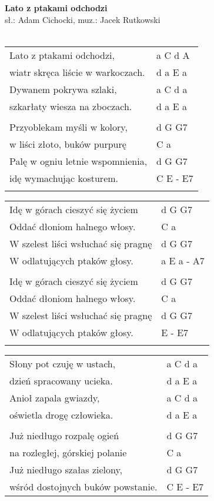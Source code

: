\documentclass[a5paper]{article}
\begin{document}


\noindent
\fontsize{12pt}{15pt}\selectfont
\textbf{Lato z ptakami odchodzi} \\
\fontsize{8pt}{10pt}\selectfont
sł.: Adam Cichocki, muz.: Jacek Rutkowski \\ \\
\fontsize{10pt}{12pt}\selectfont
{}
\begin{tabular}{@{}p{8cm}p{3cm}@{}}
\noindent
Lato z ptakami odchodzi, & a C d A \\
wiatr skręca liście w warkoczach. & d a E a \\
Dywanem pokrywa szlaki, & a C d a \\
szkarłaty wiesza na zboczach. & d a E a \\ \\
Przyoblekam myśli  w kolory, & d G G7 \\
w liści złoto, buków purpurę & C a \\
Palę w ogniu letnie wspomnienia, & d G G7 \\
idę wymachując kosturem. & C E - E7 \\ \\
\end{tabular}

\noindent
\begin{tabular}{@{}p{7cm}p{3cm}@{}} 
Idę w górach cieszyć się życiem & d G G7 \\
Oddać dłoniom halnego włosy. & C a \\
W szelest liści wsłuchać się pragnę & d G G7 \\ 
W odlatujących ptaków głosy. & a E a - A7 \\ \\
Idę w górach cieszyć się życiem & d G G7 \\ 
Oddać dłoniom halnego włosy. & C a \\
W szelest liści wsłuchać się pragnę & d G G7 \\
W odlatujących ptaków głosy. & E - E7 \\ \\
\end{tabular}

\noindent
\begin{tabular}{@{}p{8cm}p{3cm}@{}}
Słony pot czuję w ustach, & a C d a \\
dzień spracowany ucieka. & d a E a \\
Anioł zapala gwiazdy, & a C d a \\
oświetla drogę człowieka. & d a E a \\ \\
Już niedługo rozpalę ogień & d G G7 \\
na rozległej, górskiej polanie & C a \\
Już niedługo szałas zielony, & d G G7 \\
wśród dostojnych buków powstanie. & C E - E7
\end{tabular}
\end{document}
